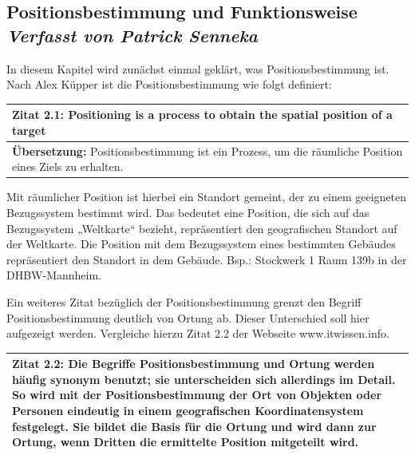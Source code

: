 \newpage
\subsection[Positionsbestimmung und Funktionsweise]{Positionsbestimmung und Funktionsweise
 \\ \textnormal{\small{\textit {Verfasst von Patrick Senneka}}}}


In diesem Kapitel wird zunächst einmal geklärt, was Positionsbestimmung ist. 
Nach Alex Küpper ist die Positionsbestimmung wie folgt definiert:

\begin{table}[h]
	\centering
	\begin{tabular}{|p{16cm}|}\hline
		\textbf{Zitat 2.1:} \glqq Positioning is a process to obtain the spatial position of a target \grqq  \cite[S.121]{Kuepper2005} \\ \hline
		\textbf{Übersetzung:} Positionsbestimmung ist ein Prozess, um die räumliche Position eines Ziels zu erhalten. \\ \hline
	\end{tabular}
\end{table}

Mit räumlicher Position ist hierbei ein Standort gemeint, der zu einem geeigneten Bezugssystem bestimmt wird. Das bedeutet eine Position, die sich auf das Bezugssystem „Weltkarte“ bezieht, repräsentiert den geografischen Standort auf der Weltkarte. Die Position mit dem Bezugssystem eines bestimmten Gebäudes repräsentiert den Standort in dem Gebäude. Bsp.: Stockwerk 1 Raum 139b in der DHBW-Mannheim.

Ein weiteres Zitat bezüglich der Positionsbestimmung grenzt den Begriff Positionsbestimmung deutlich von Ortung ab. Dieser Unterschied soll hier aufgezeigt werden. Vergleiche hierzu Zitat 2.2 der Webseite www.itwissen.info.

\begin{table}[h]
	\centering
	\begin{tabular}{|p{16cm}|}\hline
		\textbf{Zitat 2.2:} \glqq Die Begriffe Positionsbestimmung und Ortung werden häufig synonym benutzt; sie unterscheiden sich allerdings im Detail. So wird mit der Positionsbestimmung der Ort von Objekten oder Personen eindeutig in einem geografischen Koordinatensystem festgelegt. Sie bildet die Basis für die Ortung und wird dann zur Ortung, wenn Dritten die ermittelte Position mitgeteilt wird. \grqq  \cite[Positionsbestimmung]{itwissen} \\ \hline
	\end{tabular}
\end{table}

